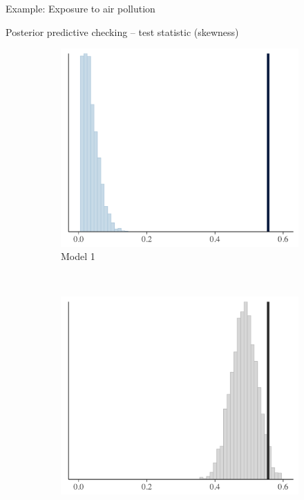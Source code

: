 \documentclass[t]{beamer}
\begin{document}
\begin{frame}

  {\Large\color{navyblue} Example: Exposure to air pollution}


  Posterior predictive checking -- test statistic (skewness)
\begin{figure}
\centering
\begin{subfigure}{0.31\textwidth}
\includegraphics[width=\textwidth]{ppc_skew1.png}
\caption{Model 1}
\end{subfigure}
~
\begin{subfigure}{0.31\textwidth}
\includegraphics[width=\textwidth]{ppc_skew2.png}

\end{subfigure}
\end{figure}
\end{frame}
\end{document}
